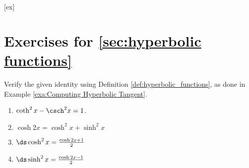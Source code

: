 [ex]
\section*{Exercises for \ref{sec:hyperbolic functions}}

\begin{enumialphparenastyle}


\begin{ex}
Verify the given identity using Definition \ref{def:hyperbolic_functions}, as done in Example \ref{exa:Computing Hyperbolic Tangent}.
\begin{enumerate}
\item $\coth^2 x-\csch^2x=1$.
\item {$\cosh 2x = \cosh^2x+\sinh^2x$}

\item {$\ds\cosh^2x = \frac{\cosh2x+1}{2}$}

\item {$\ds\sinh^2x = \frac{\cosh2x-1}{2}$}


\end{enumerate}
\end{ex}
\end{enumialphparenastyle}
